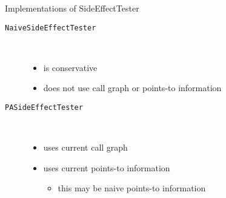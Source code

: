 \begin{slide}{Implementations of SideEffectTester}
\begin{description}
\item [\texttt{NaiveSideEffectTester}]\ \\
\begin{itemize}
\item is conservative
\item does not use call graph or points-to information
\end{itemize}
\item [\texttt{PASideEffectTester}]\ \\
\begin{itemize}
\item uses current call graph
\item uses current points-to information
\begin{itemize}
\item this may be naive points-to information
\end{itemize}
\end{itemize}
\end{description}
\end{slide}

